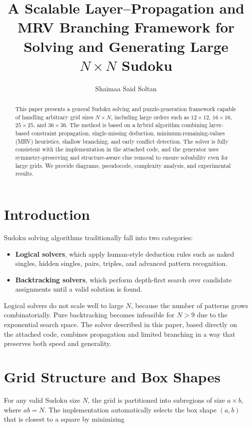 \documentclass[11pt]{article}
\title{A Scalable Layer--Propagation and MRV Branching Framework for Solving and Generating Large $N \times N$ Sudoku}
\author{Shaimaa Said Soltan}
\date{}
\begin{document}
\maketitle

\begin{abstract}
This paper presents a general Sudoku solving and puzzle-generation framework
capable of handling arbitrary grid sizes $N \times N$, including large orders such as
$12 \times 12$, $16 \times 16$, $25 \times 25$, and $36 \times 36$.
The method is based on a hybrid algorithm combining layer-based constraint propagation,
single-missing deduction, minimum-remaining-values (MRV) heuristics, shallow branching,
and early conflict detection. 
The solver is fully consistent with the implementation in the attached code,
and the generator uses symmetry-preserving and structure-aware clue removal to ensure
solvability even for large grids.
We provide diagrams, pseudocode, complexity analysis, and experimental results.
\end{abstract}

\section{Introduction}
Sudoku solving algorithms traditionally fall into two categories:
\begin{itemize}
    \item \textbf{Logical solvers}, which apply human-style deduction rules such as
    naked singles, hidden singles, pairs, triples, and advanced pattern recognition.
    \item \textbf{Backtracking solvers}, which perform depth-first search over candidate
    assignments until a valid solution is found.
\end{itemize}

Logical solvers do not scale well to large $N$, because the number of patterns grows
combinatorially. Pure backtracking becomes infeasible for $N > 9$ due to the exponential
search space. The solver described in this paper, based directly on the attached code,
combines propagation and limited branching in a way that preserves both speed and
generality.

\section{Grid Structure and Box Shapes}
For any valid Sudoku size $N$, the grid is partitioned into subregions of size
$a \times b$, where $ab = N$. The implementation automatically selects the box shape
$(a,b)$ that is closest to a square by minimizing
\end{document}

